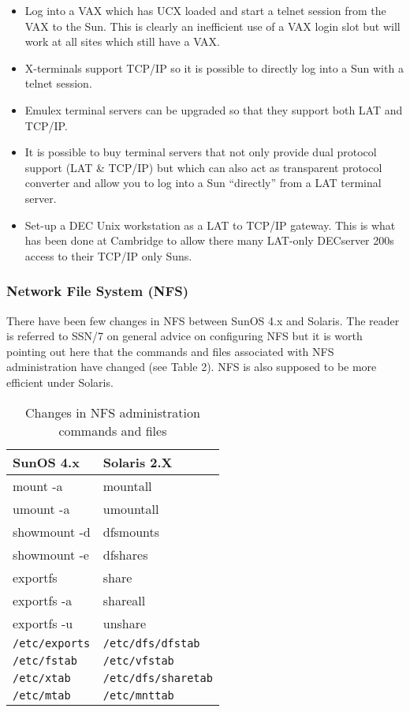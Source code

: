 \begin{itemize}

\item Log into a VAX which has UCX loaded and start a telnet session
from the VAX to the Sun. This is clearly an inefficient use of a VAX 
login slot but will work at all sites which still have a VAX.

\item X-terminals support TCP/IP so it is possible to directly log into a Sun
with a telnet session.

\item Emulex terminal servers can be upgraded so that they support both LAT
and TCP/IP.

\item It is possible to buy terminal servers that not only provide dual
protocol support (LAT \& TCP/IP) but which can also act as transparent 
protocol converter and allow you to log into a Sun ``directly'' from
a LAT terminal server. 

\item Set-up a DEC Unix workstation as a LAT to TCP/IP gateway. This is what
has been done at Cambridge to allow there many LAT-only DECserver 200s 
access to their TCP/IP only Suns. 

\end{itemize}

\subsubsection{Network File System (NFS)}

There have been few changes in NFS between SunOS 4.x and
Solaris. The reader is referred to SSN/7 on general advice on
configuring NFS but it is worth pointing out here that the commands
and files associated with NFS administration have changed (see Table 2). 
NFS is also supposed to be more efficient under Solaris. 

\begin{table}[htb]
\begin{center}
\begin{tabular}{||l|l||}
\hline

SunOS 4.x & Solaris 2.X\\
\hline
mount -a 		&       mountall     	\\
umount -a		&	umountall	\\
showmount -d		&	dfsmounts	\\
showmount -e		&	dfshares	\\
exportfs		&	share		\\
exportfs -a		&	shareall	\\
exportfs -u		&	unshare		\\
\hline
{\tt /etc/exports}	& {\tt /etc/dfs/dfstab} \\
{\tt /etc/fstab}	& {\tt /etc/vfstab}	\\
{\tt /etc/xtab}		& {\tt /etc/dfs/sharetab} \\
{\tt /etc/mtab}		& {\tt /etc/mnttab}	\\
\hline
\end {tabular}
\caption{Changes in NFS administration commands and files}
\end{center}
\end {table}


